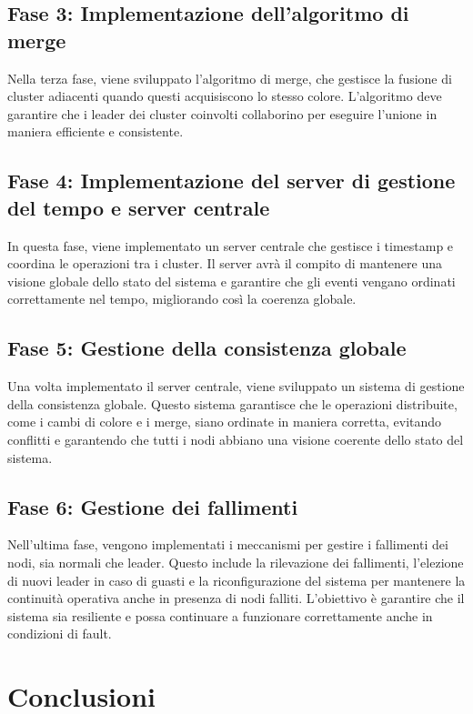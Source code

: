 \documentclass[12pt, a4paper]{report}
\begin{document}
\subsection*{Fase 3: Implementazione dell'algoritmo di merge}

Nella terza fase, viene sviluppato l'algoritmo di merge, che gestisce la fusione di cluster adiacenti quando questi acquisiscono lo stesso colore. L'algoritmo deve garantire che i leader dei cluster coinvolti collaborino per eseguire l'unione in maniera efficiente e consistente.

\subsection*{Fase 4: Implementazione del server di gestione del tempo e server centrale}

In questa fase, viene implementato un server centrale che gestisce i timestamp e coordina le operazioni tra i cluster. Il server avr\`a il compito di mantenere una visione globale dello stato del sistema e garantire che gli eventi vengano ordinati correttamente nel tempo, migliorando così la coerenza globale.

\subsection*{Fase 5: Gestione della consistenza globale}

Una volta implementato il server centrale, viene sviluppato un sistema di gestione della consistenza globale. Questo sistema garantisce che le operazioni distribuite, come i cambi di colore e i merge, siano ordinate in maniera corretta, evitando conflitti e garantendo che tutti i nodi abbiano una visione coerente dello stato del sistema.

\subsection*{Fase 6: Gestione dei fallimenti}

Nell'ultima fase, vengono implementati i meccanismi per gestire i fallimenti dei nodi, sia normali che leader. Questo include la rilevazione dei fallimenti, l'elezione di nuovi leader in caso di guasti e la riconfigurazione del sistema per mantenere la continuit\`a operativa anche in presenza di nodi falliti. L'obiettivo \`e garantire che il sistema sia resiliente e possa continuare a funzionare correttamente anche in condizioni di fault.

\section{Conclusioni}
\end{document}
